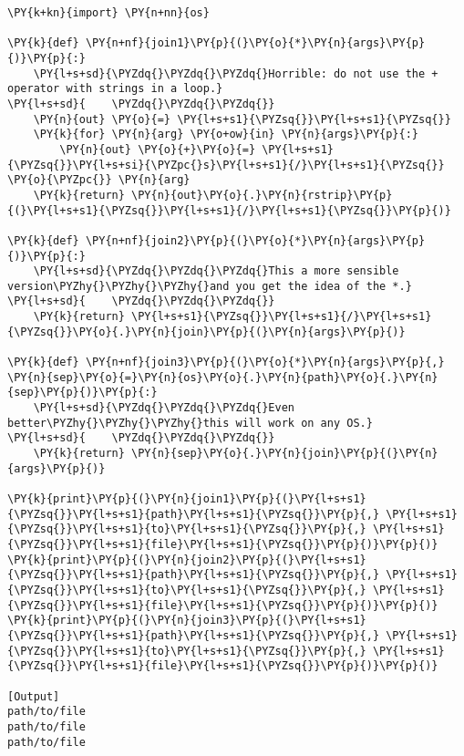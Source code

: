\begin{Verbatim}[label=\makebox{\url{https://bitbucket.org/lbaldini/programming/src/tip/snippets/func\_variadic2.py}},commandchars=\\\{\}]
\PY{k+kn}{import} \PY{n+nn}{os}

\PY{k}{def} \PY{n+nf}{join1}\PY{p}{(}\PY{o}{*}\PY{n}{args}\PY{p}{)}\PY{p}{:}
    \PY{l+s+sd}{\PYZdq{}\PYZdq{}\PYZdq{}Horrible: do not use the + operator with strings in a loop.}
\PY{l+s+sd}{    \PYZdq{}\PYZdq{}\PYZdq{}}
    \PY{n}{out} \PY{o}{=} \PY{l+s+s1}{\PYZsq{}}\PY{l+s+s1}{\PYZsq{}}
    \PY{k}{for} \PY{n}{arg} \PY{o+ow}{in} \PY{n}{args}\PY{p}{:}
        \PY{n}{out} \PY{o}{+}\PY{o}{=} \PY{l+s+s1}{\PYZsq{}}\PY{l+s+si}{\PYZpc{}s}\PY{l+s+s1}{/}\PY{l+s+s1}{\PYZsq{}} \PY{o}{\PYZpc{}} \PY{n}{arg}
    \PY{k}{return} \PY{n}{out}\PY{o}{.}\PY{n}{rstrip}\PY{p}{(}\PY{l+s+s1}{\PYZsq{}}\PY{l+s+s1}{/}\PY{l+s+s1}{\PYZsq{}}\PY{p}{)}

\PY{k}{def} \PY{n+nf}{join2}\PY{p}{(}\PY{o}{*}\PY{n}{args}\PY{p}{)}\PY{p}{:}
    \PY{l+s+sd}{\PYZdq{}\PYZdq{}\PYZdq{}This a more sensible version\PYZhy{}\PYZhy{}\PYZhy{}and you get the idea of the *.}
\PY{l+s+sd}{    \PYZdq{}\PYZdq{}\PYZdq{}}
    \PY{k}{return} \PY{l+s+s1}{\PYZsq{}}\PY{l+s+s1}{/}\PY{l+s+s1}{\PYZsq{}}\PY{o}{.}\PY{n}{join}\PY{p}{(}\PY{n}{args}\PY{p}{)}

\PY{k}{def} \PY{n+nf}{join3}\PY{p}{(}\PY{o}{*}\PY{n}{args}\PY{p}{,} \PY{n}{sep}\PY{o}{=}\PY{n}{os}\PY{o}{.}\PY{n}{path}\PY{o}{.}\PY{n}{sep}\PY{p}{)}\PY{p}{:}
    \PY{l+s+sd}{\PYZdq{}\PYZdq{}\PYZdq{}Even better\PYZhy{}\PYZhy{}\PYZhy{}this will work on any OS.}
\PY{l+s+sd}{    \PYZdq{}\PYZdq{}\PYZdq{}}
    \PY{k}{return} \PY{n}{sep}\PY{o}{.}\PY{n}{join}\PY{p}{(}\PY{n}{args}\PY{p}{)}

\PY{k}{print}\PY{p}{(}\PY{n}{join1}\PY{p}{(}\PY{l+s+s1}{\PYZsq{}}\PY{l+s+s1}{path}\PY{l+s+s1}{\PYZsq{}}\PY{p}{,} \PY{l+s+s1}{\PYZsq{}}\PY{l+s+s1}{to}\PY{l+s+s1}{\PYZsq{}}\PY{p}{,} \PY{l+s+s1}{\PYZsq{}}\PY{l+s+s1}{file}\PY{l+s+s1}{\PYZsq{}}\PY{p}{)}\PY{p}{)}
\PY{k}{print}\PY{p}{(}\PY{n}{join2}\PY{p}{(}\PY{l+s+s1}{\PYZsq{}}\PY{l+s+s1}{path}\PY{l+s+s1}{\PYZsq{}}\PY{p}{,} \PY{l+s+s1}{\PYZsq{}}\PY{l+s+s1}{to}\PY{l+s+s1}{\PYZsq{}}\PY{p}{,} \PY{l+s+s1}{\PYZsq{}}\PY{l+s+s1}{file}\PY{l+s+s1}{\PYZsq{}}\PY{p}{)}\PY{p}{)}
\PY{k}{print}\PY{p}{(}\PY{n}{join3}\PY{p}{(}\PY{l+s+s1}{\PYZsq{}}\PY{l+s+s1}{path}\PY{l+s+s1}{\PYZsq{}}\PY{p}{,} \PY{l+s+s1}{\PYZsq{}}\PY{l+s+s1}{to}\PY{l+s+s1}{\PYZsq{}}\PY{p}{,} \PY{l+s+s1}{\PYZsq{}}\PY{l+s+s1}{file}\PY{l+s+s1}{\PYZsq{}}\PY{p}{)}\PY{p}{)}

[Output]
path/to/file
path/to/file
path/to/file
\end{Verbatim}